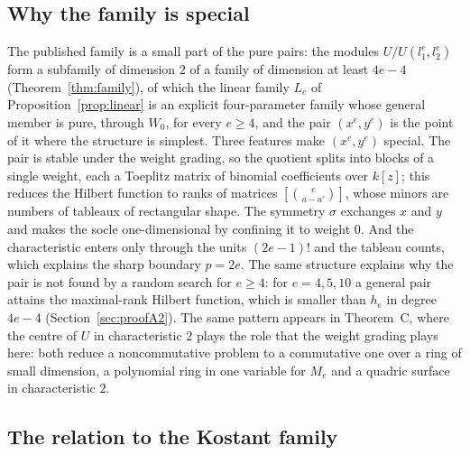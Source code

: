 \documentclass[11pt]{article}
\theoremstyle{definition}
\theoremstyle{remark}
\begin{document}
\subsection{Why the family is special}

The published family is a small part of the pure pairs: the modules $U/U(l_1^e,l_2^e)$ form a subfamily of dimension $2$ of a family of dimension at least $4e-4$ (Theorem~\ref{thm:family}), of which the linear family $L_e$ of Proposition~\ref{prop:linear} is an explicit four-parameter family whose general member is pure, through $W_0$, for every $e\ge4$, and the pair $(x^e,y^e)$ is the point of it where the structure is simplest. Three features make $(x^e,y^e)$ special. The pair is stable under the weight grading, so the quotient splits into blocks of a single weight, each a Toeplitz matrix of binomial coefficients over $k[z]$; this reduces the Hilbert function to ranks of matrices $[\binom e{a-a'}]$, whose minors are numbers of tableaux of rectangular shape. The symmetry $\sigma$ exchanges $x$ and $y$ and makes the socle one-dimensional by confining it to weight $0$. And the characteristic enters only through the units $(2e-1)!$ and the tableau counts, which explains the sharp boundary $p=2e$. The same structure explains why the pair is not found by a random search for $e\ge4$: for $e=4,5,10$ a general pair attains the maximal-rank Hilbert function, which is smaller than $h_e$ in degree $4e-4$ (Section~\ref{sec:proofA2}). The same pattern appears in Theorem~C, where the centre of $U$ in characteristic $2$ plays the role that the weight grading plays here: both reduce a noncommutative problem to a commutative one over a ring of small dimension, a polynomial ring in one variable for $M_e$ and a quadric surface in characteristic $2$.

\subsection{The relation to the Kostant family}
\end{document}
